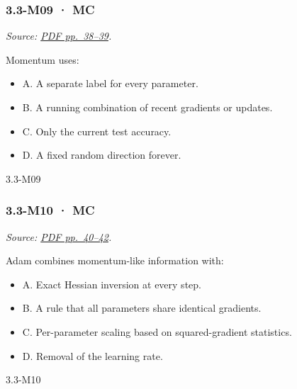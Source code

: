\noindent\begin{minipage}{\linewidth}

\subsubsection{3.3-M09 · MC}\label{m09-mc-9}

\emph{Source:
\href{../Lecture\%20Slides/3.3.\%20Deep\%20Learning\%20Fundamentals.pdf\#page=38}{PDF
pp.~38--39}.}

Momentum uses:

\begin{itemize}
\tightlist
\item
  A. A separate label for every parameter.
\item
  B. A running combination of recent gradients or updates.
\item
  C. Only the current test accuracy.
\item
  D. A fixed random direction forever.
\end{itemize}

\begin{solution}[8mm]{3.3-M09}

\end{solution}
\end{minipage}\par\medskip

\noindent\begin{minipage}{\linewidth}

\subsubsection{3.3-M10 · MC}\label{m10-mc-9}

\emph{Source:
\href{../Lecture\%20Slides/3.3.\%20Deep\%20Learning\%20Fundamentals.pdf\#page=40}{PDF
pp.~40--42}.}

Adam combines momentum-like information with:

\begin{itemize}
\tightlist
\item
  A. Exact Hessian inversion at every step.
\item
  B. A rule that all parameters share identical gradients.
\item
  C. Per-parameter scaling based on squared-gradient statistics.
\item
  D. Removal of the learning rate.
\end{itemize}

\begin{solution}[8mm]{3.3-M10}

\end{solution}
\end{minipage}\par\medskip

